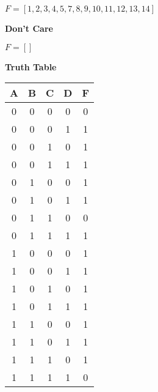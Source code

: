 $F = [1, 2, 3, 4, 5, 7, 8, 9, 10, 11, 12, 13, 14]$

\textbf{Don't Care }

$F = []$



\textbf{Truth Table }



\begin{tabular}{|c|c|c|c||c|}
\hline
A & B & C & D & F \\

    
        \hline
    
  
  
  0 & 0 & 0 & 0 & 0 \\

    
  
  
  0 & 0 & 0 & 1 & 1 \\

    
  
  
  0 & 0 & 1 & 0 & 1 \\

    
  
  
  0 & 0 & 1 & 1 & 1 \\

    
        \hline
    
  
  
  0 & 1 & 0 & 0 & 1 \\

    
  
  
  0 & 1 & 0 & 1 & 1 \\

    
  
  
  0 & 1 & 1 & 0 & 0 \\

    
  
  
  0 & 1 & 1 & 1 & 1 \\

    
        \hline
    
  
  
  1 & 0 & 0 & 0 & 1 \\

    
  
  
  1 & 0 & 0 & 1 & 1 \\

    
  
  
  1 & 0 & 1 & 0 & 1 \\

    
  
  
  1 & 0 & 1 & 1 & 1 \\

    
        \hline
    
  
  
  1 & 1 & 0 & 0 & 1 \\

    
  
  
  1 & 1 & 0 & 1 & 1 \\

    
  
  
  1 & 1 & 1 & 0 & 1 \\

    
  
  
  1 & 1 & 1 & 1 & 0 \\

\hline
\end{tabular}


